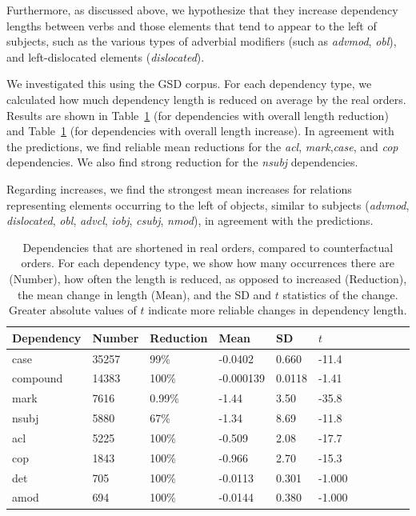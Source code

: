 \documentclass[11pt,a4paper]{article}
\begin{document}
Furthermore, as discussed above, we hypothesize that they increase dependency lengths between verbs and those elements that tend to appear to the left of subjects, such as the various types of adverbial modifiers (such as \textit{advmod}, \textit{obl}), and left-dislocated elements (\textit{dislocated}).

We investigated this using the GSD corpus. %
For each dependency type, we calculated how much dependency length is reduced on average by the real orders.
Results are shown in Table~\ref{fig:shortened} (for dependencies with overall length reduction) and Table~\ref{fig:shortened} (for dependencies with overall length increase).
In agreement with the predictions, we find reliable mean reductions for the \emph{acl}, \emph{mark},\emph{case}, and \emph{cop} dependencies.
We also find strong reduction for the \emph{nsubj} dependencies.


Regarding increases, we find the strongest mean increases for relations representing elements occurring to the left of objects, similar to subjects (\emph{advmod}, \emph{dislocated}, \emph{obl}, \emph{advcl}, \emph{iobj}, \emph{csubj}, \emph{nmod}), in agreement with the predictions. %

\begin{table}
\begin{center}
\begin{tabular}{l|llllllllll}
   Dependency  &Number &Reduction     &  Mean   &   SD &       $t$ \\ \hline
  case & 35257  &  99\% & -0.0402     &0.660  & -11.4   \\
 compound     &14383  &  100\%     & -0.000139   &0.0118 &  -1.41  \\ 
 mark  & 7616  &  0.99\% & -1.44       &3.50 &   -35.8   \\
  nsubj        & 5880  &  67\% & -1.34       &8.69  &  -11.8   \\
  acl          & 5225  &  100\%     & -0.509      &2.08  &  -17.7   \\
 cop   & 1843  &  100\%    &  -0.966      &2.70  &  -15.3   \\
 det          &  705  &  100\%    &  -0.0113     &0.301 &   -1.000 \\
 amod         &  694  &  100\%    &  -0.0144     &0.380 &   -1.000 \\
\end{tabular}
\end{center}
\caption{Dependencies that are shortened in real orders, compared to counterfactual orders. For each dependency type, we show how many occurrences there are (Number), how often the length is reduced, as opposed to increased (Reduction), the mean change in length (Mean), and the SD and $t$ statistics of the change. Greater absolute values of $t$ indicate more reliable changes in dependency length.}\label{fig:shortened}
\end{table}
\end{document}
